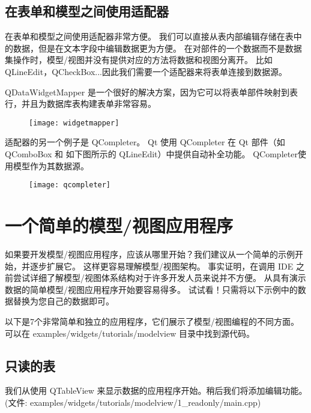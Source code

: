 
\subsection{在表单和模型之间使用适配器}

在表单和模型之间使用适配器非常方便。
我们可以直接从表内部编辑存储在表中的数据，但是在文本字段中编辑数据更为方便。
在对部件的一个数据而不是数据集操作时，模型/视图并没有提供对应的方法将数据和视图分离开。
比如 QLineEdit，QCheckBox...因此我们需要一个适配器来将表单连接到数据源。

QDataWidgetMapper 是一个很好的解决方案，因为它可以将表单部件映射到表行，并且为数据库表构建表单非常容易。

\begin{figure}[hbt!]  
\texttt{[image: widgetmapper]}
\end{figure}

适配器的另一个例子是 QCompleter。
Qt 使用 QCompleter 在 Qt 部件（如 QComboBox 和 如下图所示的 QLineEdit）中提供自动补全功能。
QCompleter使用模型作为其数据源。
	
\begin{figure}[hbt!]  
\texttt{[image: qcompleter]}
\end{figure}

\section{一个简单的模型/视图应用程序}

如果要开发模型/视图应用程序，应该从哪里开始？我们建议从一个简单的示例开始，并逐步扩展它。
这样更容易理解模型/视图架构。
事实证明，在调用 IDE 之前尝试详细了解模型/视图体系结构对于许多开发人员来说并不方便。
从具有演示数据的简单模型/视图应用程序开始要容易得多。
试试看！只需将以下示例中的数据替换为您自己的数据即可。

以下是7个非常简单和独立的应用程序，它们展示了模型/视图编程的不同方面。
可以在 examples/widgets/tutorials/modelview 目录中找到源代码。

\subsection{只读的表}

我们从使用 QTableView 来显示数据的应用程序开始。稍后我们将添加编辑功能。
(文件: examples/widgets/tutorials/modelview/1\_readonly/main.cpp)

